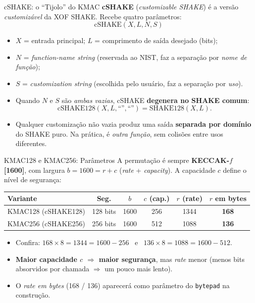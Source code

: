 \documentclass{beamer}
\begin{document}
\begin{frame}{cSHAKE: o ``Tijolo'' do KMAC}
    \textbf{cSHAKE} (\textit{customizable SHAKE}) é a versão \emph{customizável} da XOF SHAKE. Recebe quatro parâmetros:
    \[
        \text{cSHAKE}(X, L, N, S)
    \]
    \begin{itemize}
        \footnotesize
        \item $X$ = entrada principal; \quad $L$ = comprimento de saída desejado (bits);
        \item $N$ = \textit{function-name string} (reservada ao NIST, faz a separação por \emph{nome de função});
        \item $S$ = \textit{customization string} (escolhida pelo usuário, faz a separação por \emph{uso}).
    \end{itemize}
    \medskip
    \begin{itemize}
        \footnotesize
        \item Quando $N$ e $S$ são \emph{ambas vazias}, cSHAKE \textbf{degenera no SHAKE comum}:
        \[
            \text{cSHAKE128}(X, L, \text{``''}, \text{``''}) = \text{SHAKE128}(X, L).
        \]
        \item Qualquer customização não vazia produz uma saída \textbf{separada por domínio} do SHAKE puro. Na prática, é \emph{outra função}, sem colisões entre usos diferentes.
    \end{itemize}
\end{frame}

\begin{frame}{KMAC128 e KMAC256: Parâmetros}
    A permutação é sempre \textbf{KECCAK-$f$[1600]}, com largura $b = 1600 = r + c$ (\textit{rate} + \textit{capacity}). A capacidade $c$ define o nível de segurança:
    \medskip
    \begin{center}
        \small
        \begin{tabular}{lccccc}
            \toprule
            \textbf{Variante} & \textbf{Seg.} & \textbf{$b$} & \textbf{$c$ (cap.)} & \textbf{$r$ (rate)} & \textbf{$r$ em bytes} \\
            \midrule
            \rowcolor{green!12} KMAC128 (cSHAKE128) & 128 bits & 1600 & 256 & 1344 & \textbf{168} \\
            \rowcolor{green!12} KMAC256 (cSHAKE256) & 256 bits & 1600 & 512 & 1088 & \textbf{136} \\
            \bottomrule
        \end{tabular}
    \end{center}
    \medskip
    \begin{itemize}
        \footnotesize
        \item Confira: $168 \times 8 = 1344 = 1600 - 256$ \ e \ $136 \times 8 = 1088 = 1600 - 512$.
        \item \textbf{Maior capacidade $c$ $\Rightarrow$ maior segurança}, mas \emph{rate} menor (menos bits absorvidos por chamada $\Rightarrow$ um pouco mais lento).
        \item O \emph{rate em bytes} (168 / 136) aparecerá como parâmetro do \texttt{bytepad} na construção.
    \end{itemize}
\end{frame}
\end{document}
